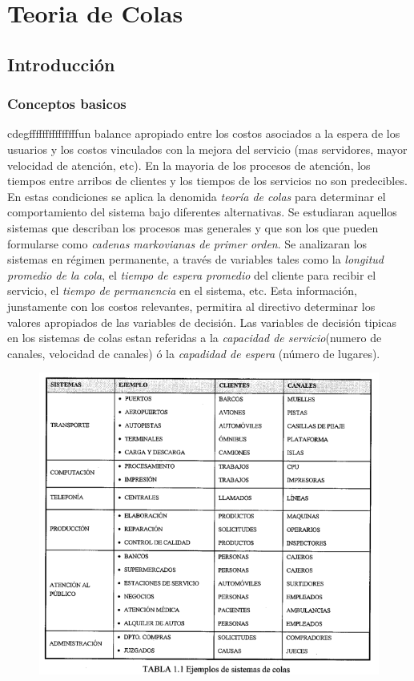 \documentclass{article}
\begin{document}
\newpage{}
\tableofcontents
\newpage{}

\newpage
\section{Teoria de Colas}

\subsection{Introducción}
\subsubsection{Conceptos basicos}
cdegfffffffffffffffun balance apropiado entre los costos asociados a la espera de los usuarios y los costos vinculados con la mejora del servicio (mas servidores, mayor velocidad de atención, etc).
En la mayoria de los procesos de atención, los tiempos entre arribos de clientes y los tiempos de los servicios no son predecibles. En estas condiciones se aplica la denomida \textit{teoría de colas} para determinar el comportamiento del sistema bajo diferentes alternativas.
Se estudiaran aquellos sistemas que describan los procesos mas generales y que son los que pueden formularse como \textit{cadenas markovianas de primer orden}. Se analizaran los sistemas en régimen permanente, a través de variables tales como la \textit{longitud promedio de la cola}, el \textit{tiempo de espera promedio} del cliente para recibir el servicio, el \textit{tiempo de permanencia} en el sistema, etc. 
Esta información, junstamente con los costos relevantes, permitira al directivo determinar los valores apropiados de las variables de decisión. Las variables de decisión tipicas en los sistemas de colas estan referidas a la \textit{capacidad de servicio}(numero de canales, velocidad de canales) ó la \textit{capadidad de espera} (número de lugares).

    \begin{figure}[h!]
        \includegraphics[width=\linewidth]{imagenes/ejemplo_sistemas_colas.png}
    \end{figure}
\end{document}

